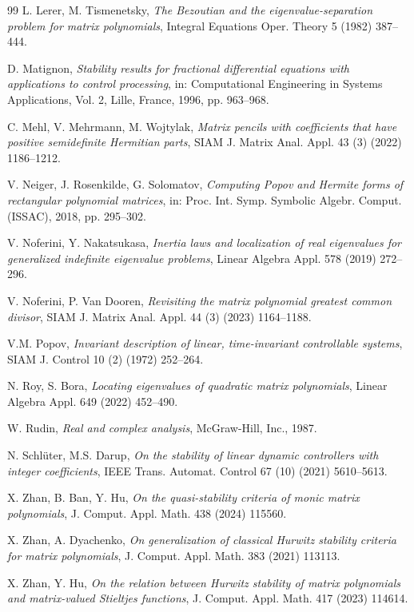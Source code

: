 \documentclass[12pt,reqno]{amsart}
\theoremstyle{plain}
\numberwithin{equation}{section}
\theoremstyle{remark}
\begin{document}
\begin{thebibliography}{99}
 L. Lerer, M. Tismenetsky, \textit{The Bezoutian and the eigenvalue-separation problem for matrix polynomials}, Integral Equations Oper. Theory 5 (1982) 387--444.


 D. Matignon, \textit{Stability results for fractional differential equations with applications to control processing}, in: Computational Engineering in
Systems Applications, Vol. 2, Lille, France, 1996, pp. 963–968.

 C. Mehl, V. Mehrmann, M. Wojtylak, \textit{Matrix pencils with coefficients that have
positive semidefinite Hermitian parts}, SIAM J. Matrix Anal. Appl. 43 (3) (2022) 1186--1212.

 V. Neiger, J. Rosenkilde, G. Solomatov, \textit{Computing Popov and Hermite forms of rectangular polynomial matrices}, in: Proc. Int. Symp. Symbolic Algebr. Comput. (ISSAC), 2018,
pp. 295--302.


 V. Noferini, Y. Nakatsukasa, \textit{Inertia laws and localization of real eigenvalues for generalized indefinite eigenvalue problems},  Linear Algebra  Appl. 578 (2019) 272--296.

 V. Noferini, P. Van Dooren, \textit{Revisiting the matrix polynomial greatest common divisor}, SIAM J. Matrix Anal. Appl. 44 (3) (2023) 1164--1188.

 V.M. Popov,  \textit{Invariant description of linear, time-invariant controllable
systems}, SIAM J. Control 10 (2) (1972) 252--264.

 N. Roy, S. Bora, \textit{Locating eigenvalues of quadratic matrix polynomials}, Linear
Algebra Appl. 649 (2022) 452--490.

 W. Rudin, \textit{Real and complex analysis}, McGraw-Hill, Inc., 1987.

 N. 
Schl\"{u}ter, M.S. Darup, \textit{On the stability of linear dynamic controllers with integer coefficients}, IEEE Trans. Automat. Control 67 (10) (2021) 5610–5613.

 X. Zhan, B. Ban, Y. Hu, \textit{On the quasi-stability criteria of monic matrix polynomials}, J. Comput. Appl. Math. 438 (2024) 115560.

  X. Zhan,  A. Dyachenko, \textit{On  generalization of classical Hurwitz stability criteria  for matrix polynomials}, J. Comput. Appl. Math. 383 (2021) 113113.

 X. Zhan, Y. Hu, \textit{On the relation between Hurwitz stability of matrix polynomials and matrix-valued Stieltjes functions}, J. Comput. Appl. Math. 417 (2023) 114614.



\end{thebibliography}
\end{document}
